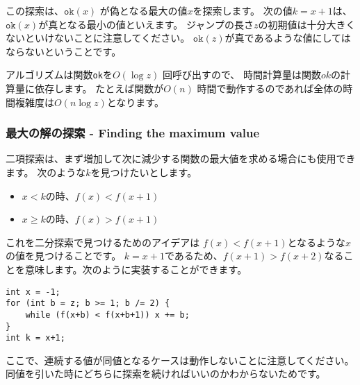 この探索は、$\texttt{ok}(x)$ が偽となる最大の値$x$を探索します。
次の値$k=x+1$は、$\texttt{ok}(x)$が真となる最小の値といえます。
ジャンプの長さ$z$の初期値は十分大きくないといけないことに注意してください。
$\texttt{ok}(z)$が真であるような値にしてはならないということです。

アルゴリズムは関数\texttt{ok}を$O(\log z)$ 回呼び出すので、
時間計算量は関数$ok$の計算量に依存します。
たとえば関数が$ O(n)$ 時間で動作するのであれば全体の時間複雑度は$O(n \log z)$となります。

\subsubsection{最大の解の探索 - Finding the maximum value}
二項探索は、まず増加して次に減少する関数の最大値を求める場合にも使用できます。
次のような$k$を見つけたいとします。

\begin{itemize}
\item
$x<k$の時、$f(x)<f(x+1)$
\item
$x \ge k$の時、$f(x)>f(x+1)$
\end{itemize}

これを二分探索で見つけるためのアイデアは $f(x)<f(x+1)$となるような$x$の値を見つけることです。
$k=x+1$であるため、$f(x+1)>f(x+2)$なることを意味します。次のように実装することができます。
\begin{lstlisting}
int x = -1;
for (int b = z; b >= 1; b /= 2) {
    while (f(x+b) < f(x+b+1)) x += b;
}
int k = x+1;
\end{lstlisting}

ここで、連続する値が同値となるケースは動作しないことに注意してください。
同値を引いた時にどちらに探索を続ければいいのかわからないためです。